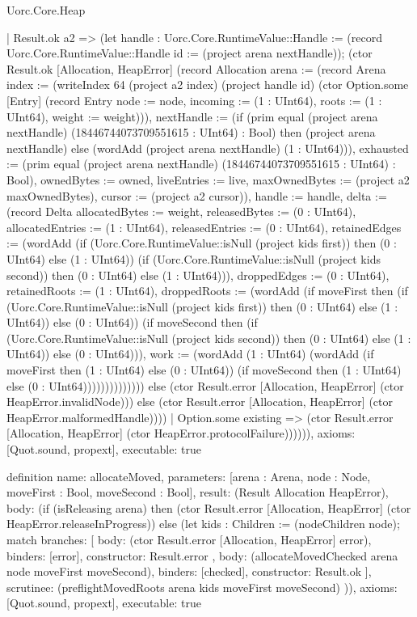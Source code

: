 \begin{lexlean}{Uorc.Core.Heap}
\begin{semanticmodule}
{              | Result.ok a2 => (let handle : Uorc.Core.RuntimeValue::Handle := (record Uorc.Core.RuntimeValue::Handle {id := (project arena nextHandle)}); (ctor Result.ok [Allocation, HeapError] (record Allocation {arena := (record Arena {index := (writeIndex 64 (project a2 index) (project handle id) (ctor Option.some [Entry] (record Entry {node := node, incoming := (1 : UInt64), roots := (1 : UInt64), weight := weight}))), nextHandle := (if (prim equal (project arena nextHandle) (18446744073709551615 : UInt64) : Bool) then (project arena nextHandle) else (wordAdd (project arena nextHandle) (1 : UInt64))), exhausted := (prim equal (project arena nextHandle) (18446744073709551615 : UInt64) : Bool), ownedBytes := owned, liveEntries := live, maxOwnedBytes := (project a2 maxOwnedBytes), cursor := (project a2 cursor)}), handle := handle, delta := (record Delta {allocatedBytes := weight, releasedBytes := (0 : UInt64), allocatedEntries := (1 : UInt64), releasedEntries := (0 : UInt64), retainedEdges := (wordAdd (if (Uorc.Core.RuntimeValue::isNull (project kids first)) then (0 : UInt64) else (1 : UInt64)) (if (Uorc.Core.RuntimeValue::isNull (project kids second)) then (0 : UInt64) else (1 : UInt64))), droppedEdges := (0 : UInt64), retainedRoots := (1 : UInt64), droppedRoots := (wordAdd (if moveFirst then (if (Uorc.Core.RuntimeValue::isNull (project kids first)) then (0 : UInt64) else (1 : UInt64)) else (0 : UInt64)) (if moveSecond then (if (Uorc.Core.RuntimeValue::isNull (project kids second)) then (0 : UInt64) else (1 : UInt64)) else (0 : UInt64))), work := (wordAdd (1 : UInt64) (wordAdd (if moveFirst then (1 : UInt64) else (0 : UInt64)) (if moveSecond then (1 : UInt64) else (0 : UInt64))))})}))))))))) else (ctor Result.error [Allocation, HeapError] (ctor HeapError.invalidNode))) else (ctor Result.error [Allocation, HeapError] (ctor HeapError.malformedHandle))))
    | Option.some existing => (ctor Result.error [Allocation, HeapError] (ctor HeapError.protocolFailure)))))),
  axioms: [Quot.sound, propext],
  executable: true
}

definition{
  name: allocateMoved,
  parameters: [arena : Arena, node : Node, moveFirst : Bool, moveSecond : Bool],
  result: (Result Allocation HeapError),
  body: (if (isReleasing arena) then (ctor Result.error [Allocation, HeapError] (ctor HeapError.releaseInProgress)) else (let kids : Children := (nodeChildren node); match{
    branches: [
      {
        body: (ctor Result.error [Allocation, HeapError] error),
        binders: [error],
        constructor: Result.error
      },
      {
        body: (allocateMovedChecked arena node moveFirst moveSecond),
        binders: [checked],
        constructor: Result.ok
      }
    ],
    scrutinee: (preflightMovedRoots arena kids moveFirst moveSecond)
  })),
  axioms: [Quot.sound, propext],
  executable: true
}


\end{semanticmodule}
\end{lexlean}

